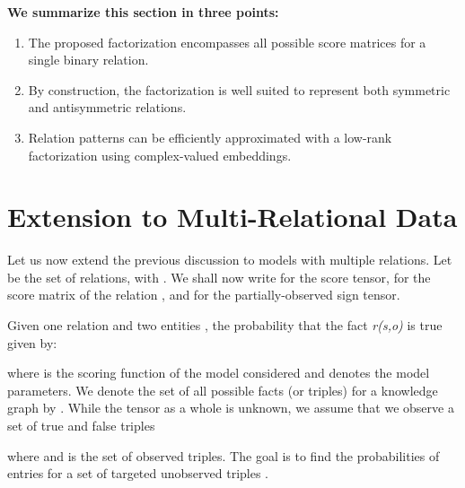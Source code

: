 \documentclass[twoside,11pt]{article}
\begin{document}
\textbf{We summarize this section in three points:}

\begin{enumerate}
    \item The proposed factorization encompasses all possible score matrices  for a single binary relation.
    \item By construction, the factorization is well suited to represent both symmetric and antisymmetric relations.
    \item Relation patterns can be efficiently approximated
with a low-rank factorization using complex-valued embeddings.
\end{enumerate}


































\section{Extension to Multi-Relational Data}
\label{sec:tens_case}

Let us now extend the previous discussion to models with multiple relations.
Let  be the set of relations, with .
We shall now write  for the score tensor,
 for the score matrix of the relation ,
and  for the partially-observed sign tensor.



Given one relation  and two entities  , the probability that the fact \emph{r(s,o)} is true given by:

where  is the scoring function of the model considered and  denotes the model parameters.
We denote the set of all possible facts (or triples) for a knowledge graph by .
While the tensor  as a whole is unknown, we 
assume that we observe a set of true and false triples 
 
where 
and  is the set of observed triples. 
The goal is to find the probabilities of entries 
 for a set of targeted unobserved 
triples .
\end{document}
